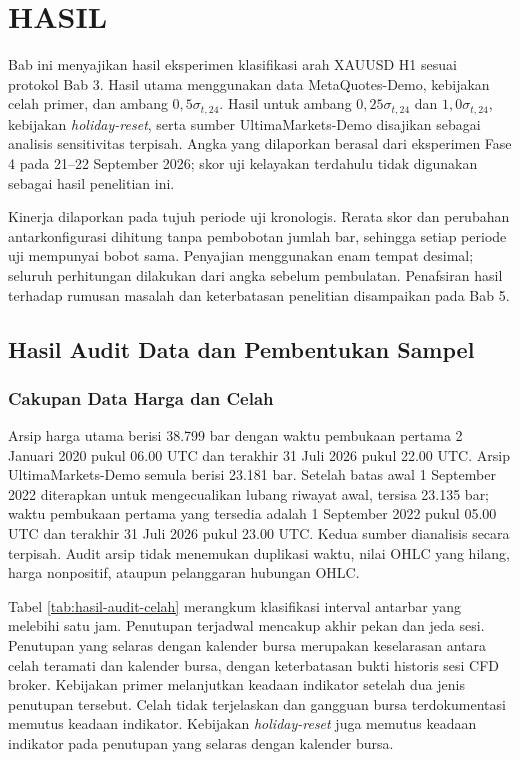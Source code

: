 \chapter{HASIL}
\label{bab:hasil}

Bab ini menyajikan hasil eksperimen klasifikasi arah XAUUSD H1 sesuai protokol Bab 3. Hasil utama menggunakan data MetaQuotes-Demo, kebijakan celah primer, dan ambang $0{,}5\sigma_{t,24}$. Hasil untuk ambang $0{,}25\sigma_{t,24}$ dan $1{,}0\sigma_{t,24}$, kebijakan \emph{holiday-reset}, serta sumber UltimaMarkets-Demo disajikan sebagai analisis sensitivitas terpisah. Angka yang dilaporkan berasal dari eksperimen Fase 4 pada 21--22 September 2026; skor uji kelayakan terdahulu tidak digunakan sebagai hasil penelitian ini.

Kinerja dilaporkan pada tujuh periode uji kronologis. Rerata skor dan perubahan antarkonfigurasi dihitung tanpa pembobotan jumlah bar, sehingga setiap periode uji mempunyai bobot sama. Penyajian menggunakan enam tempat desimal; seluruh perhitungan dilakukan dari angka sebelum pembulatan. Penafsiran hasil terhadap rumusan masalah dan keterbatasan penelitian disampaikan pada Bab 5.

\section{Hasil Audit Data dan Pembentukan Sampel}

\subsection{Cakupan Data Harga dan Celah}

Arsip harga utama berisi 38.799 bar dengan waktu pembukaan pertama 2 Januari 2020 pukul 06.00 UTC dan terakhir 31 Juli 2026 pukul 22.00 UTC. Arsip UltimaMarkets-Demo semula berisi 23.181 bar. Setelah batas awal 1 September 2022 diterapkan untuk mengecualikan lubang riwayat awal, tersisa 23.135 bar; waktu pembukaan pertama yang tersedia adalah 1 September 2022 pukul 05.00 UTC dan terakhir 31 Juli 2026 pukul 23.00 UTC. Kedua sumber dianalisis secara terpisah. Audit arsip tidak menemukan duplikasi waktu, nilai OHLC yang hilang, harga nonpositif, ataupun pelanggaran hubungan OHLC.

Tabel \ref{tab:hasil-audit-celah} merangkum klasifikasi interval antarbar yang melebihi satu jam. Penutupan terjadwal mencakup akhir pekan dan jeda sesi. Penutupan yang selaras dengan kalender bursa merupakan keselarasan antara celah teramati dan kalender bursa, dengan keterbatasan bukti historis sesi CFD broker. Kebijakan primer melanjutkan keadaan indikator setelah dua jenis penutupan tersebut. Celah tidak terjelaskan dan gangguan bursa terdokumentasi memutus keadaan indikator. Kebijakan \emph{holiday-reset} juga memutus keadaan indikator pada penutupan yang selaras dengan kalender bursa.


